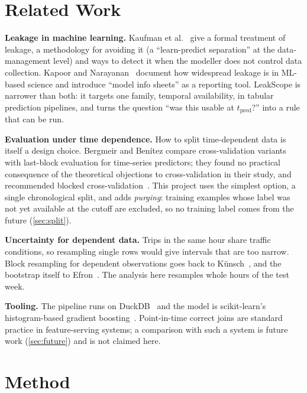 \documentclass[11pt,a4paper]{article}
\newcommand{\tpred}{$t_{\mathrm{pred}}$}
\begin{document}
\section{Related Work}
\textbf{Leakage in machine learning.} Kaufman et al.~\cite{kaufman2012} give a formal treatment of leakage, a methodology for avoiding it (a ``learn-predict separation'' at the data-management level) and ways to detect it when the modeller does not control data collection. Kapoor and Narayanan~\cite{kapoor2023} document how widespread leakage is in ML-based science and introduce ``model info sheets'' as a reporting tool. LeakScope is narrower than both: it targets one family, temporal availability, in tabular prediction pipelines, and turns the question ``was this usable at \tpred{}?'' into a rule that can be run.

\textbf{Evaluation under time dependence.} How to split time-dependent data is itself a design choice. Bergmeir and Benítez compare cross-validation variants with last-block evaluation for time-series predictors; they found no practical consequence of the theoretical objections to cross-validation in their study, and recommended blocked cross-validation~\cite{bergmeir2012}. This project uses the simplest option, a single chronological split, and adds \emph{purging}: training examples whose label was not yet available at the cutoff are excluded, so no training label comes from the future (\autoref{sec:split}).

\textbf{Uncertainty for dependent data.} Trips in the same hour share traffic conditions, so resampling single rows would give intervals that are too narrow. Block resampling for dependent observations goes back to K\"unsch~\cite{kunsch1989}, and the bootstrap itself to Efron~\cite{efron1979}. The analysis here resamples whole hours of the test week.

\textbf{Tooling.} The pipeline runs on DuckDB~\cite{raasveldt2019} and the model is scikit-learn's histogram-based gradient boosting~\cite{pedregosa2011}. Point-in-time correct joins are standard practice in feature-serving systems; a comparison with such a system is future work (\autoref{sec:future}) and is not claimed here.

\section{Method}
\end{document}
